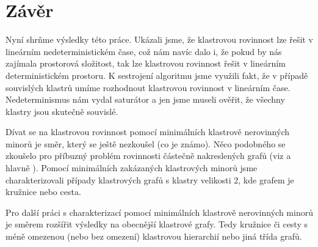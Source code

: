 \chapter{Závěr}

Nyní shrňme výsledky této práce. Ukázali jsme, že klastrovou rovinnost lze řešit v lineárním nedeterministickém čase, což nám navíc dalo i, že pokud by nás zajímala prostorová složitost, tak lze klastrovou rovinnost řešit v lineárním deterministickém prostoru.  K sestrojení algoritmu jsme využili fakt, že v případě souvislých klastrů umíme rozhodnout klastrovou rovinnost v lineárním čase. Nedeterminismus nám vydal saturátor a jen jsme museli ověřit, že všechny klastry jsou skutečně souvislé.

Dívat se na klastrovou rovinnost pomocí minimálních klastrově nerovinných minorů je směr, který se ještě nezkoušel (co je známo). Něco podobného se zkoušelo pro příbuzný problém rovinnosti částečně nakreslených grafů (viz \cite{AngeliniEtAl10} a hlavně \cite{JelinekEtAl10}). Pomocí minimálních zakázaných klastrových minorů jsme charakterizovali případy klastrových grafů s klastry velikosti 2, kde grafem je kružnice nebo cesta.

Pro další práci s charakterizací pomocí minimálních klastrově nerovinných minorů je směrem rozšířit výsledky na obecnější klastrové grafy.  Tedy kružnice či cesty s méně omezenou (nebo bez omezení) klastrovou hierarchií nebo jiná třída grafů.